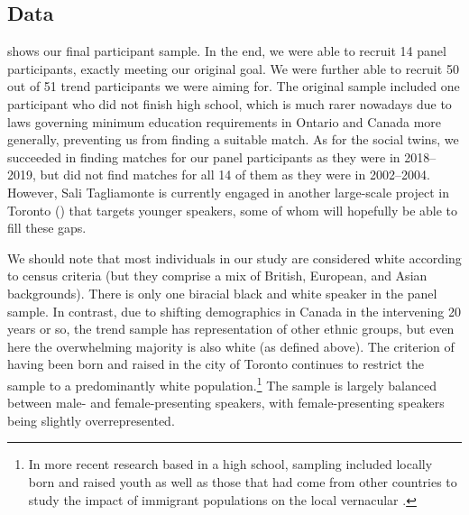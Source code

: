 \documentclass[output=paper]{langscibook}
\begin{document}
\subsection{Data}
\label{sec:pabst:3.4}

 shows our final participant sample. In the end, we were able to recruit 14 panel participants, exactly meeting our original goal. We were further able to recruit 50 out of 51 trend participants we were aiming for. The original sample included one participant who did not finish high school, which is much rarer nowadays due to laws governing minimum education requirements in Ontario and Canada more generally, preventing us from finding a suitable match. As for the social twins, we succeeded in finding matches for our panel participants as they were in 2018--2019, but did not find matches for all 14 of them as they were in 2002--2004. However, Sali Tagliamonte is currently engaged in another large-scale project in Toronto (\citealt{Tagliamonte2018}) that targets younger speakers, some of whom will hopefully be able to fill these gaps.

We should note that most individuals in our study are considered white according to census criteria (but they comprise a mix of British, European, and Asian backgrounds). There is only one biracial black and white speaker in the panel sample. In contrast, due to shifting demographics in Canada in the intervening 20 years or so, the trend sample has representation of other ethnic groups, but even here the overwhelming majority is also white (as defined above). The criterion of having been born and raised in the city of Toronto continues to restrict the sample to a predominantly white population.\footnote{In more recent research based in a high school, sampling included locally born and raised youth as well as those that had come from other countries to study the impact of immigrant populations on the local vernacular \citep{TagliamonteManuscript}.}  The sample is largely balanced between male- and female-presenting speakers, with female-presenting speakers being slightly overrepresented.
\end{document}
